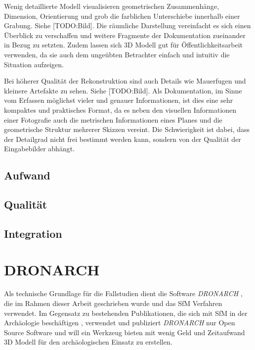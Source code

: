 			Wenig detaillierte Modell visualisieren geometrischen Zusammenhänge, Dimension, Orientierung und grob die farblichen Unterschiebe innerhalb einer Grabung. Siehe [TODO:Bild]. Die räumliche Darstellung vereinfacht es sich einen Überblick zu verschaffen und weitere Fragmente der Dokumentation zueinander in Bezug zu setzten.
			Zudem lassen sich 3D Modell gut für Öffentlichkeitsarbeit verwenden, da sie auch dem ungeübten Betrachter einfach und intuitiv die Situation aufzeigen.
			
			Bei höherer Qualität der Rekonstruktion sind auch Details wie Mauerfugen und kleinere Artefakte zu sehen. Siehe [TODO:Bild]. Als Dokumentation, im Sinne vom Erfassen möglichst vieler und genauer Informationen, ist dies eine sehr kompaktes und praktisches Format, da es neben den visuellen Informationen einer Fotografie auch die metrischen Informationen eines Planes und die geometrische Struktur mehrerer Skizzen vereint. Die Schwierigkeit ist dabei, dass der Detailgrad nicht frei bestimmt werden kann, sondern von der Qualität der Eingabebilder abhängt.
			
		\subsection{Aufwand}
		\subsection{Qualität}
		\subsection{Integration}
		
	\section{DRONARCH}
		Als technische Grundlage für die Fallstudien dient die Software \emph{DRONARCH} \cite{dronarch:github}, die im Rahmen dieser Arbeit geschrieben wurde und das SfM Verfahren verwendet.
		Im Gegensatz zu bestehenden Publikationen, die sich mit SfM in der Archäologie beschäftigen \cite{arch:laser_vs_dense_stereo, ARCM:ARCM667, ARP:ARP399, TUW-210216, DeReu20131108, the_cave, altai}, verwendet und publiziert \emph{DRONARCH} nur Open Source Software und will ein Werkzeug bieten mit wenig Geld und Zeitaufwand 3D Modell für den archäologischen Einsatz zu erstellen.

	